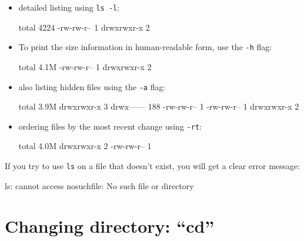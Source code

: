 \begin{itemize}
\item detailed listing using \lstinline|ls -l|:

\begin{prompt}
total 4224
-rw-rw-r-- 1 %
drwxrwxr-x 2 %
\end{prompt}

\item To print the size information in human-readable form, use the \lstinline|-h| flag:

\begin{prompt}
total 4.1M
-rw-rw-r-- 1 %
drwxrwxr-x 2 %
\end{prompt}

\item also listing hidden files using the \lstinline|-a| flag:

\begin{prompt}
total 3.9M
drwxrwxr-x   3 %
drwx------ 188 %
-rw-rw-r--   1 %
-rw-rw-r--   1 %
drwxrwxr-x   2 %
\end{prompt}

\item ordering files by the most recent change using \lstinline|-rt|:

\begin{prompt}
total 4.0M
drwxrwxr-x 2 %
-rw-rw-r-- 1 %
\end{prompt}

\end{itemize}

If you try to use \lstinline|ls| on a file that doesn't exist, you will get a clear error message:

\begin{prompt}
ls: cannot access nosuchfile: No such file or directory
\end{prompt}

\section{Changing directory: ``cd''}

